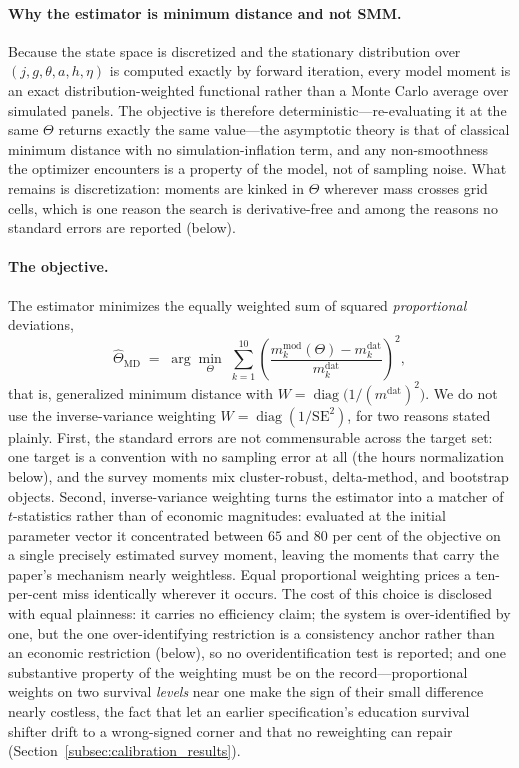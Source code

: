 \documentclass[12pt,a4paper]{article}
\begin{document}
\paragraph{Why the estimator is minimum distance and not SMM.} Because the state space is discretized and the stationary distribution over $(j,g,\theta,a,h,\eta)$ is computed exactly by forward iteration, every model moment is an exact distribution-weighted functional rather than a Monte Carlo average over simulated panels. The objective is therefore deterministic---re-evaluating it at the same $\Theta$ returns exactly the same value---the asymptotic theory is that of classical minimum distance with no simulation-inflation term, and any non-smoothness the optimizer encounters is a property of the model, not of sampling noise. What remains is discretization: moments are kinked in $\Theta$ wherever mass crosses grid cells, which is one reason the search is derivative-free and among the reasons no standard errors are reported (below).

\paragraph{The objective.} The estimator minimizes the equally weighted sum of squared \emph{proportional} deviations,
\begin{equation}
\label{eq:smm_objective}
\widehat\Theta_{\mathrm{MD}} \;=\; \arg\min_{\Theta}\; \sum_{k=1}^{10} \left( \frac{m_k^{\mathrm{mod}}(\Theta) - m_k^{\mathrm{dat}}}{m_k^{\mathrm{dat}}} \right)^{2},
\end{equation}
that is, generalized minimum distance with $W=\operatorname{diag}\bigl(1/(m^{\mathrm{dat}})^2\bigr)$. We do not use the inverse-variance weighting $W=\operatorname{diag}(1/\mathrm{SE}^2)$, for two reasons stated plainly. First, the standard errors are not commensurable across the target set: one target is a convention with no sampling error at all (the hours normalization below), and the survey moments mix cluster-robust, delta-method, and bootstrap objects. Second, inverse-variance weighting turns the estimator into a matcher of $t$-statistics rather than of economic magnitudes: evaluated at the initial parameter vector it concentrated between $65$ and $80$ per cent of the objective on a single precisely estimated survey moment, leaving the moments that carry the paper's mechanism nearly weightless. Equal proportional weighting prices a ten-per-cent miss identically wherever it occurs. The cost of this choice is disclosed with equal plainness: it carries no efficiency claim; the system is over-identified by one, but the one over-identifying restriction is a consistency anchor rather than an economic restriction (below), so no overidentification test is reported; and one substantive property of the weighting must be on the record---proportional weights on two survival \emph{levels} near one make the sign of their small difference nearly costless, the fact that let an earlier specification's education survival shifter drift to a wrong-signed corner and that no reweighting can repair (Section~\ref{subsec:calibration_results}).
\end{document}
